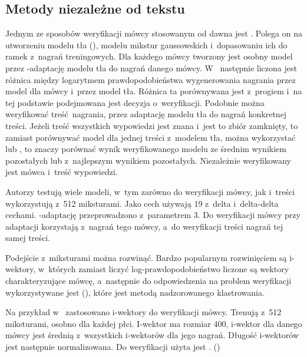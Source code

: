 \subsection{Metody niezależne od tekstu}

Jednym ze sposobów weryfikacji mówcy stosowanym od dawna jest . Polega on na utworzeniu modelu tła
(), modelu mikstur gaussowskich i~dopasowaniu ich do ramek  z~nagrań
treningowych. Dla każdego mówcy tworzony jest osobny model przez -adaptację modelu tła do nagrań danego
mówcy. W~\cite{utteranceVerificationFor}
następnie liczona jest różnica między logarytmem prawdopodobieństwa wygenerowania nagrania przez model
dla mówcy i~przez model tła. Różnica ta porównywana jest z~progiem i~na tej podstawie podejmowana jest decyzja
o~weryfikacji. Podobnie można weryfikować treść nagrania, przez adaptację modelu tła do nagrań konkretnej treści.
Jeżeli treść wszystkich wypowiedzi jest znana i~jest to zbiór zamknięty, to zamiast porównywać model dla jednej
treści z~modelem tła, można wykorzystać  lub , to znaczy porównać wynik weryfikowanego
modelu ze średnim wynikiem pozostałych lub z~najlepszym wynikiem pozostałych. Niezależnie weryfikowany jest mówca
i~treść wypowiedzi.

Autorzy testują wiele modeli, w~tym zarówno do weryfikacji mówcy, jak i~treści wykorzystują  z~512 miksturami.
Jako cech używają 19  z~delta i~delta-delta cechami. -adaptację przeprowadzono
z~parametrem  3.
Do weryfikacji mówcy przy adaptacji korzystają z~nagrań tego mówcy, a~do weryfikacji treści nagrań tej samej treści.

Podejście z~miksturami można rozwinąć. Bardzo popularnym rozwinięciem są i-wektory, w~których
zamiast liczyć log-prawdopodobieństwo liczone są wektory charakteryzujące mówcę, a~następnie do
odpowiedzenia na problem weryfikacji wykorzystywane
jest  (), które jest metodą nadzorowanego klastrowania.

Na przykład w~\cite{utteranceVerificationFor}
zastosowano i-wektory do weryfikacji mówcy. Trenują  z~512 miksturami, osobno dla każdej płci.
I-wektor ma rozmiar 400, i-wektor dla danego mówcy jest średnią z~wszystkich i-wektorów dla jego nagrań.
Długość i-wektorów jest następnie normalizowana. Do weryfikacji użyta jest .
()

